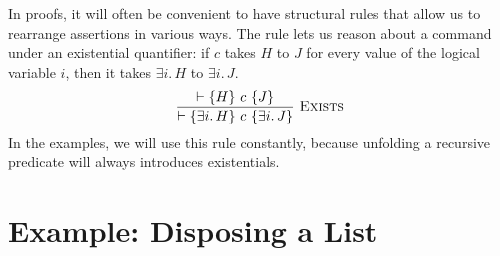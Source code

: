 % 

In proofs, it will often be convenient to have structural rules that allow us to rearrange
assertions in various ways. The  rule lets us reason about a command under an
existential quantifier: if $c$ takes $H$ to $J$ for every value of the logical variable $i$, then
it takes $\exists i.\,H$ to $\exists i.\,J$.
\[
  \dfrac{\vdash\{H\}\ c\ \{J\}}{\vdash\{\exists i.\,H\}\ c\ \{\exists i.\,J\}}\ \textsc{Exists}
\]
In the examples, we will use this rule constantly, because unfolding a recursive predicate will
always introduces existentials.

\section{Example: Disposing a List}


